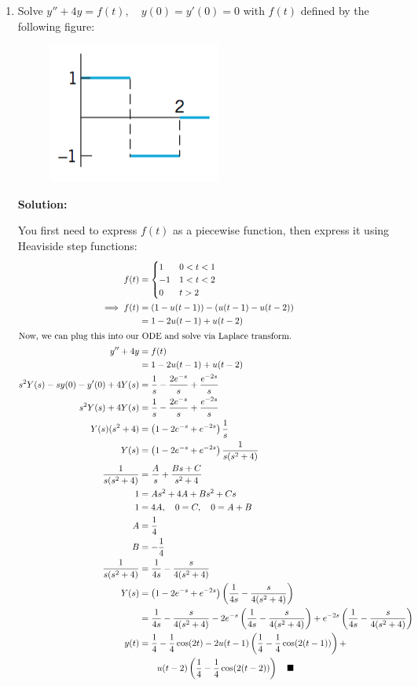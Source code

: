 \documentclass[letterpaper, fontsize=11pt]{scrartcl} %
\numberwithin{equation}{section} %
\numberwithin{figure}{section} %
\numberwithin{table}{section} %
\begin{document}
\begin{enumerate}
\item Solve $y'' + 4y = f(t),\quad y(0) = y'(0) = 0$ with $f(t)$ defined by the following figure:
\begin{figure}[H]
\centering \includegraphics[width = 0.3\columnwidth]{LaplaceFig2.png}
\end{figure}
\par \textbf{Solution:}
\par You first need to express $f(t)$ as a piecewise function, then express it using Heaviside step functions:
\begin{align*}
f(t) &= \begin{cases}
1 & 0< t < 1\\
-1 & 1< t< 2\\
0 & t > 2
\end{cases}\\
\implies f(t) &= (1 - u(t-1)) - (u(t-1) - u(t - 2))\\
&= 1 - 2u(t-1) + u(t-2)\\
\intertext{Now, we can plug this into our ODE and solve via Laplace transform.}
y'' + 4y &= f(t)\\
&=  1 - 2u(t-1) + u(t-2)\\
s^2 Y(s) - sy(0) - y'(0) + 4Y(s) &= \frac{1}{s} - \frac{2e^{-s}}{s} + \frac{e^{-2s}}{s}\\
s^2 Y(s) + 4Y(s) &= \frac{1}{s} - \frac{2e^{-s}}{s} + \frac{e^{-2s}}{s}\\
Y(s) (s^2 + 4) &= \left( 1 - 2e^{-s} + e^{-2s}\right)\frac{1}{s}\\
Y(s) &= \left( 1 - 2e^{-s} + e^{-2s}\right)\frac{1}{s(s^2 + 4)}\\
\frac{1}{s(s^2 + 4)} &= \frac{A}{s} + \frac{Bs + C}{s^2 + 4}\\
1 &= As^2 + 4A + Bs^2 + Cs\\
1 &= 4A,\quad 0 = C,\quad 0 = A + B\\
A &= \frac{1}{4}\\
B&= -\frac{1}{4}\\
\frac{1}{s(s^2 + 4)} &= \frac{1}{4s} - \frac{s}{4(s^2 + 4)}\\
Y(s) &= \left( 1 - 2e^{-s} + e^{-2s}\right)\left(\frac{1}{4s} - \frac{s}{4(s^2 + 4)}\right)\\
&= \frac{1}{4s} - \frac{s}{4(s^2 + 4)} - 2e^{-s}\left(\frac{1}{4s} - \frac{s}{4(s^2 + 4)}\right) + e^{-2s}\left(\frac{1}{4s} - \frac{s}{4(s^2 + 4)}\right)\\
y(t) &= \frac{1}{4} - \frac{1}{4}\cos(2t) - 2u(t-1)\left(\frac{1}{4} - \frac{1}{4}\cos(2(t-1))\right) + \\
& \qquad u(t-2)\left(\frac{1}{4} - \frac{1}{4}\cos(2(t-2))\right)\quad\blacksquare
\end{align*}

\end{enumerate}



\end{document}
